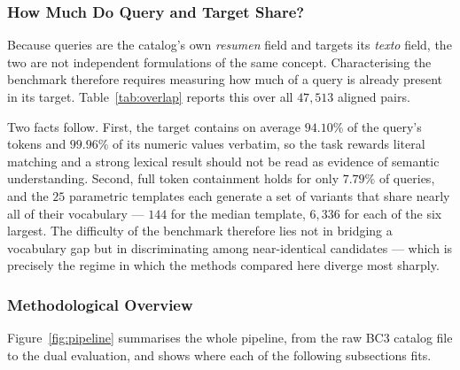 \documentclass[preprint,12pt]{elsarticle}
\begin{document}
\subsubsection{How Much Do Query and Target Share?}
\label{subsec:overlap}

Because queries are the catalog's own \textit{resumen} field and targets its \textit{texto} field, the two are not independent formulations of the same concept. Characterising the benchmark therefore requires measuring how much of a query is already present in its target. Table~\ref{tab:overlap} reports this over all $47{,}513$ aligned pairs.

\begin{table}[ht]
\centering
\caption{Lexical and numeric overlap between each query (\textit{resumen}) and its target document (\textit{texto}), over all 47,513 aligned pairs. Coverage is the fraction of query tokens, or query numeric values, that also occur in the target.}
\label{tab:overlap}

\end{table}

Two facts follow. First, the target contains on average $94.10\%$ of the query's tokens and $99.96\%$ of its numeric values verbatim, so the task rewards literal matching and a strong lexical result should not be read as evidence of semantic understanding. Second, full token containment holds for only $7.79\%$ of queries, and the $25$ parametric templates each generate a set of variants that share nearly all of their vocabulary --- $144$ for the median template, $6{,}336$ for each of the six largest. The difficulty of the benchmark therefore lies not in bridging a vocabulary gap but in discriminating among near-identical candidates --- which is precisely the regime in which the methods compared here diverge most sharply.

\subsubsection{Methodological Overview}

Figure~\ref{fig:pipeline} summarises the whole pipeline, from the raw BC3 catalog file to the dual evaluation, and shows where each of the following subsections fits.
\end{document}
